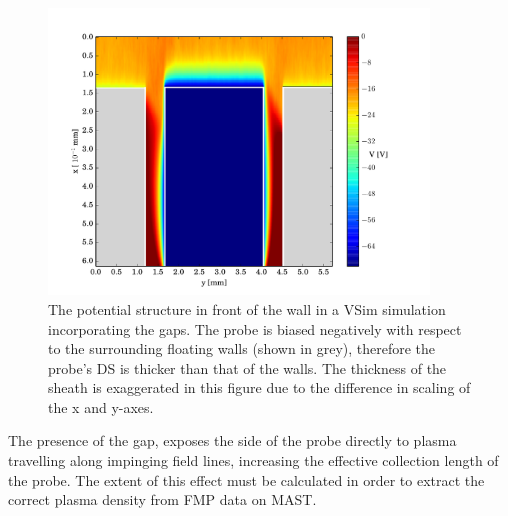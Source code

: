 \begin{figure}[H]
	\centering
	\includegraphics[width=0.9\textwidth]{potential_75V.pdf}
	\caption{The potential structure in front of the wall in a VSim simulation incorporating the gaps. The probe is biased negatively with respect to the surrounding floating walls (shown in grey), therefore the probe's DS is thicker than that of the walls. The thickness of the sheath is exaggerated in this figure due to the difference in scaling of the x and y-axes.}
	\label{fig:thicker_sheath}
\end{figure}




The presence of the gap, exposes the side of the probe directly to plasma travelling along impinging field lines, increasing the effective collection length of the probe. The extent of this effect must be calculated in order to extract the correct plasma density from FMP data on MAST.



